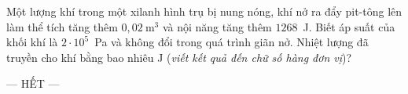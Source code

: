 	\begin{ex}%
		Một lượng khí trong một xilanh hình trụ bị nung nóng, khí nở ra đẩy pit-tông lên làm thể tích tăng thêm $0{,}02~\text{m}^3$ và nội năng tăng thêm $1268$~J. Biết áp suất của khối khí là $2\cdot 10^5$~Pa và không đổi trong quá trình giãn nở. Nhiệt lượng đã truyền cho khí bằng bao nhiêu J (\textit{viết kết quả đến chữ số hàng đơn vị})?
		\par
	\end{ex}

	\centerline{--- HẾT ---}


